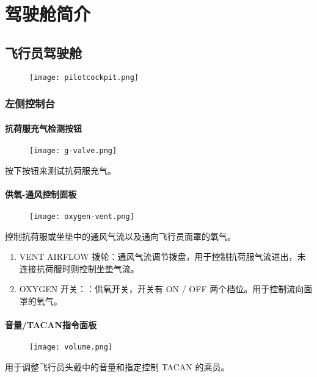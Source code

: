 
\chapter{驾驶舱简介}

\section{飞行员驾驶舱}

\begin{figure}[h]
  \center
  \texttt{[image: pilotcockpit.png]}
\end{figure}

\subsection{左侧控制台}

\subsubsection{抗荷服充气检测按钮}
\begin{figure}[h]
  \center
  \texttt{[image: g-valve.png]}
\end{figure}
按下按钮来测试抗荷服充气。

\subsubsection{供氧-通风控制面板}

\begin{figure}[h]
  \center
  \texttt{[image: oxygen-vent.png]}
\end{figure}
控制抗荷服或坐垫中的通风气流以及通向飞行员面罩的氧气。

\begin{enumerate}
  \item VENT AIRFLOW 拨轮：通风气流调节拨盘，用于控制抗荷服气流进出，未连接抗荷服时则控制坐垫气流。
  \item OXYGEN 开关：：供氧开关，开关有 ON / OFF 两个档位。用于控制流向面罩的氧气。
\end{enumerate}

\subsubsection{音量/TACAN指令面板}

\begin{figure}[h]
  \center
  \texttt{[image: volume.png]}
\end{figure}
用于调整飞行员头戴中的音量和指定控制 TACAN 的乘员。

